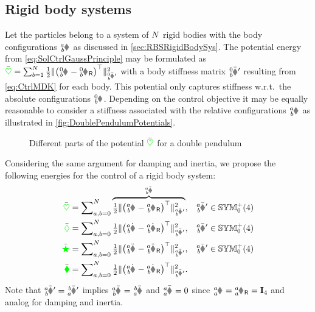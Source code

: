 \subsection{Rigid body systems}\label{sec:CtrlApproachParticlesRBS}
Let the particles belong to a system of $N$ rigid bodies with the body configurations $\bodyHomoCoord{\BidxI}{\BidxII}$ as discussed in \autoref{sec:RBSRigidBodySys}.
The potential energy from \eqref{eq:SolCtrlGaussPrinciple} may be formulated as $\potentialEnergyC = \sum_{\BidxII=1}^{\numRigidBodies} \tfrac{1}{2} \norm[\bodyStiffMatCp{0}{\BidxII}]{\big(\bodyHomoCoord{0}{\BidxII} - \bodyHomoCoordR{0}{\BidxII}\big)^\top}^2$ with a body stiffness matrix $\bodyStiffMatCp{0}{\BidxII}$ resulting from \eqref{eq:CtrlMDK} for each body.
This potential only captures stiffness w.r.t.\ the absolute configurations $\bodyHomoCoord{0}{\BidxII}$.
Depending on the control objective it may be equally reasonable to consider a stiffness associated with the relative configurations $\bodyHomoCoord{\BidxI}{\BidxII}$ as illustrated in \autoref{fig:DoublePendulumPotentials}.
\begin{figure}[ht]
 \centering
 
 \caption{Different parts of the potential $\bar{\textcolor{green}{\heartsuit}}$ for a double pendulum}
 \label{fig:DoublePendulumPotentials}
\end{figure}
Considering the same argument for damping and inertia, we propose the following energies for the control of a rigid body system:
\begin{subequations}\label{eq:RBSCtrlEnergies1}
\begin{align}
 \potentialEnergyC &= \sum\nolimits_{\BidxI,\BidxII=0}^{\numRigidBodies} \overbrace{\tfrac{1}{2} \norm[\bodyStiffMatCp{\BidxI}{\BidxII}]{\big(\bodyHomoCoord{\BidxI}{\BidxII} - \bodyHomoCoordR{\BidxI}{\BidxII}\big)^\top}^2}^{\bodyPotentialEnergyC{\BidxI}{\BidxII}},&
 \bodyStiffMatCp{\BidxI}{\BidxII} &\in \SymMatSP(4)
\\
 \dissFktC &= \sum\nolimits_{\BidxI,\BidxII=0}^{\numRigidBodies} \tfrac{1}{2} \norm[\bodyDissMatCp{\BidxI}{\BidxII}]{\big(\bodyHomoCoordd{\BidxI}{\BidxII} - \bodyHomoCoordRd{\BidxI}{\BidxII}\big)^\top}^2,&
 \bodyDissMatCp{\BidxI}{\BidxII} &\in \SymMatSP(4)
\\
 \accEnergyC &= \sum\nolimits_{\BidxI,\BidxII=0}^{\numRigidBodies} \tfrac{1}{2} \norm[\bodyInertiaMatCp{\BidxI}{\BidxII}]{\big(\bodyHomoCoorddd{\BidxI}{\BidxII} - \bodyHomoCoordRdd{\BidxI}{\BidxII}\big)^\top}^2,&
 \bodyInertiaMatCp{\BidxI}{\BidxII} &\in \SymMatSP(4)
 \label{eq:CtrlApproachParticlesRBSaccEnergyC}
\\
 \kineticEnergyC &= \sum\nolimits_{\BidxI,\BidxII=0}^{\numRigidBodies} \tfrac{1}{2} \norm[\bodyInertiaMatCp{\BidxI}{\BidxII}]{\big(\bodyHomoCoordd{\BidxI}{\BidxII} - \bodyHomoCoordRd{\BidxI}{\BidxII}\big)^\top}^2.
\end{align}
\end{subequations}
Note that $\bodyStiffMatCp{\BidxI}{\BidxII} = \bodyStiffMatCp{\BidxII}{\BidxI}$ implies $\bodyPotentialEnergyC{\BidxI}{\BidxII} = \bodyPotentialEnergyC{\BidxII}{\BidxI}$ and $\bodyPotentialEnergyC{\BidxI}{\BidxI} = 0$ since $\bodyHomoCoord{\BidxI}{\BidxI} = \bodyHomoCoordR{\BidxI}{\BidxI} = \idMat[4]$ and analog for damping and inertia.

